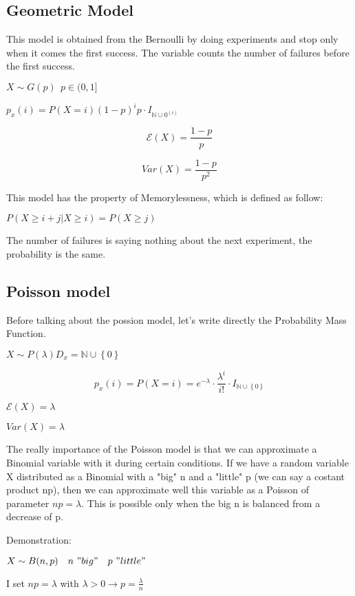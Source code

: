 \documentclass{article}
\begin{document}
\subsection{Geometric Model}

This model is obtained from the Bernoulli by doing experiments and stop only when it comes the first success. The variable counts the number of failures before the first success. 
\bigskip

$X \sim G(p) \ \ p \in (0,1]$

$p_x(i) = P(X=i) (1-p)^i p \cdot I_{\mathbb{N} \cup {0}^(i)}$
\bigskip

$$\mathcal E(X) = \frac{1-p}{p}$$

$$Var(X) = \frac{1-p}{p^2}$$
\bigskip

This model has the property of Memorylessness, which is defined as follow:

$P(X \geq i + j| X \geq i) = P(X \geq j)$

The number of failures is saying nothing about the next experiment, the probability is the same.

\subsection{Poisson model}

Before talking about the possion model, let's write directly the Probability Mass Function.

$X \sim P(\lambda) D_x = \mathbb{N} \cup \left\{0\right\}$
\bigskip

$$p_x(i) = P(X=i) = e^{- \lambda} \cdot \frac{\lambda^i}{i!} \cdot I_{\mathbb{N} \cup \left\{0\right\}}$$

\bigskip

$\mathcal E(X) = \lambda$

$Var(X) = \lambda$
\bigskip

The really importance of the Poisson model is that we can approximate a Binomial variable with it during certain conditions.
If we have a random variable X distributed as a Binomial with a "big" n and a "little" p (we can say a costant product np), then we can approximate well this variable as a Poisson of parameter $np = \lambda$.
This is possible only when the big n is balanced from a decrease of p.

\bigskip

Demonstration:

$X \sim B(n,p) \ \ \ n \ "big" \ \ \ p \ "little"$

I set $np = \lambda$ with $\lambda > 0 \longrightarrow p = \frac{\lambda}{n}$
\end{document}
